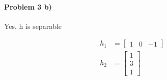 \documentclass[11pt]{article}
\begin{document}
\paragraph{\noindent\textbf{\LARGE{Problem 3 b)}}}

\begin{flushleft}
Yes, h is separable
\end{flushleft} 
\begin{equation*}
\begin{split}
h_1 & =  
\begin{bmatrix} 1  &0 &-1 \end{bmatrix} \\
h_2 & = 
\begin{bmatrix} 1 \\3 \\1\end{bmatrix}
\end{split}
\end{equation*}
\end{document}

